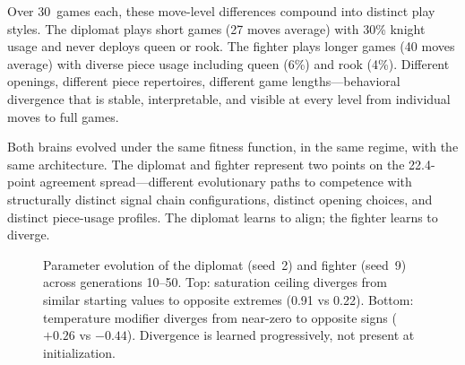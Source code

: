 \documentclass[11pt,a4paper]{article}
\begin{document}
Over 30~games each, these move-level differences compound into distinct play styles.
The diplomat plays short games (27 moves average) with 30\% knight usage and never deploys queen or rook.
The fighter plays longer games (40 moves average) with diverse piece usage including queen (6\%) and rook (4\%).
Different openings, different piece repertoires, different game lengths---behavioral divergence that is stable, interpretable, and visible at every level from individual moves to full games.

Both brains evolved under the same fitness function, in the same regime, with the same architecture.
The diplomat and fighter represent two points on the 22.4-point agreement spread---different evolutionary paths to competence with structurally distinct signal chain configurations, distinct opening choices, and distinct piece-usage profiles.
The diplomat learns to align; the fighter learns to diverge.

\begin{figure}[t]
\centering
{}
\caption{Parameter evolution of the diplomat (seed~2) and fighter (seed~9) across generations 10--50. Top: saturation ceiling diverges from similar starting values to opposite extremes (0.91 vs 0.22). Bottom: temperature modifier diverges from near-zero to opposite signs ($+0.26$ vs $-0.44$). Divergence is learned progressively, not present at initialization.}
\label{fig:param_evolution}
\end{figure}
\end{document}
